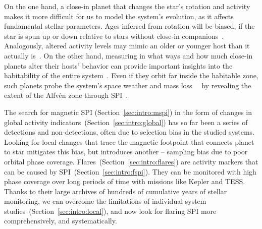 \documentclass[twocolumn]{aastex631}
\begin{document}
On the one hand, a close-in planet that changes the star's rotation and activity makes it more difficult for us to model the system's evolution, as it affects fundamental stellar parameters. Ages inferred from rotation will be biased, if the star is spun up or down relative to stars without close-in companions~\citep{tejadaarevalo2021further, brown2014discrepancies, maxted2015comparison}. Analogously, altered activity levels may mimic an older or younger host than it actually is~\citep{ilic2022tidal}. On the other hand, measuring in what ways and how much close-in planets alter their hosts' behavior can provide important insights into the habitability of the entire system~\citep{shkolnik2018signatures}. Even if they orbit far inside the habitable zone, such planets probe the system's space weather and mass loss~~\citep{cohen2011dynamics, cohen2015interaction, hazra2022impact} by revealing the extent of the Alfv\'en zone through SPI~\citep{kavanagh2021planetinduced, chebly2022destination}. %

The search for magnetic SPI (Section~\ref{sec:intro:mspi}) in the form of changes in global activity indicators~(Section~\ref{sec:intro:global}) has so far been a series of detections and non-detections, often due to selection bias in the studied systems. Looking for local changes that trace the magnetic footpoint that connects planet to star mitigates this bias, but introduces another -- sampling bias due to poor orbital phase coverage. Flares~(Section~\ref{sec:intro:flares}) are activity markers that can be caused by SPI~(Section~\ref{sec:intro:fspi}). They can be monitored with high phase coverage over long periods of time with missions like Kepler and TESS. Thanks to their large archives of hundreds of cumulative years of stellar monitoring, we can overcome the limitations of individual system studies~(Section~\ref{sec:intro:local}), and now look for flaring SPI more comprehensively, and systematically.
\end{document}
